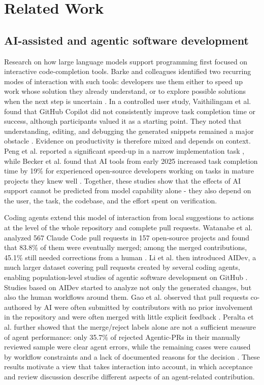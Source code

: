 \section{Related Work}\label{sec:related}

\subsection{AI-assisted and agentic software development}
Research on how large language models support programming first focused on interactive code-completion tools. Barke and colleagues identified two recurring modes of interaction with such tools: developers use them either to speed up work whose solution they already understand, or to explore possible solutions when the next step is uncertain \cite{barke2023grounded}. In a controlled user study, Vaithilingam et al. found that GitHub Copilot did not consistently improve task completion time or success, although participants valued it as a starting point. They noted that understanding, editing, and debugging the generated snippets remained a major obstacle \cite{vaithilingam2022expectation}. Evidence on productivity is therefore mixed and depends on context. Peng et al. reported a significant speed-up in a narrow implementation task \cite{peng2023impact}, while Becker et al. found that AI tools from early 2025 increased task completion time by 19\% for experienced open-source developers working on tasks in mature projects they knew well \cite{becker2025impact}. Together, these studies show that the effects of AI support cannot be predicted from model capability alone - they also depend on the user, the task, the codebase, and the effort spent on verification.

Coding agents extend this model of interaction from local suggestions to actions at the level of the whole repository and complete pull requests. Watanabe et al. analyzed 567 Claude Code pull requests in 157 open-source projects and found that 83.8\% of them were eventually merged; among the merged contributions, 45.1\% still needed corrections from a human \cite{watanabe2025agentic}. Li et al. then introduced AIDev, a much larger dataset covering pull requests created by several coding agents, enabling population-level studies of agentic software development on GitHub \cite{li2026aidev}. Studies based on AIDev started to analyze not only the generated changes, but also the human workflows around them. Gao et al. observed that pull requests co-authored by AI were often submitted by contributors with no prior involvement in the repository and were often merged with little explicit feedback \cite{gao2026autopilot}. Peralta et al. further showed that the merge/reject labels alone are not a sufficient measure of agent performance: only 35.7\% of rejected Agentic-PRs in their manually reviewed sample were clear agent errors, while the remaining cases were caused by workflow constraints and a lack of documented reasons for the decision \cite{peralta2026decisions}. These results motivate a view that takes interaction into account, in which acceptance and review discussion describe different aspects of an agent-related contribution.

